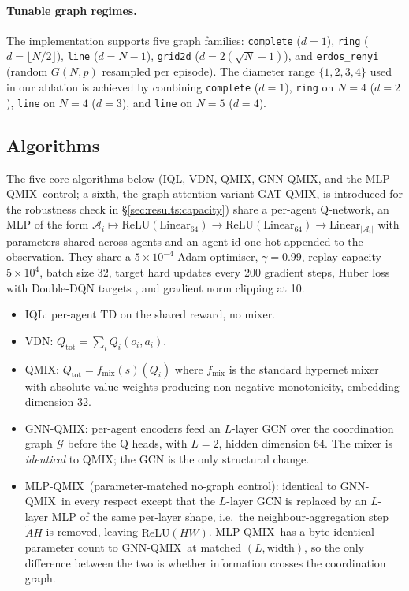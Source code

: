 \documentclass[manuscript, screen, review]{jair}
\providecommand{\citep}{\parencite}
\newcommand{\algoname}[1]{\textsc{#1}}
\newcommand{\iql}{\algoname{IQL}}
\newcommand{\vdn}{\algoname{VDN}}
\newcommand{\qmix}{\algoname{QMIX}}
\newcommand{\gnnqmix}{\algoname{GNN-QMIX}}
\newcommand{\Qtot}{Q_{\mathrm{tot}}}
\newcommand{\Qi}{Q_i}
\newcommand{\Aagent}{\mathcal{A}}
\newcommand{\Gtask}{\mathcal{G}}
\newcommand{\mlpqmix}{\algoname{MLP-QMIX}}
\newcommand{\gatqmix}{\algoname{GAT-QMIX}}
\begin{document}
\paragraph{Tunable graph regimes.} The implementation supports five graph
families: \texttt{complete} ($d=1$), \texttt{ring} ($d=\lfloor N/2 \rfloor$),
\texttt{line} ($d = N-1$), \texttt{grid2d} ($d = 2(\sqrt N - 1)$), and
\texttt{erdos\_renyi} (random $G(N, p)$ resampled per episode). The
diameter range $\{1, 2, 3, 4\}$ used in our ablation is achieved by
combining \texttt{complete} ($d=1$), \texttt{ring} on $N=4$ ($d=2$),
\texttt{line} on $N=4$ ($d=3$), and \texttt{line} on $N=5$ ($d=4$).

\subsection{Algorithms}
\label{sec:algos}

The five core algorithms below (\iql, \vdn, \qmix, \gnnqmix, and the
\mlpqmix\ control; a sixth, the graph-attention variant \gatqmix, is
introduced for the robustness check in \S\ref{sec:results:capacity})
share a per-agent Q-network, an MLP of the form
$\Aagent_i \mapsto \mathrm{ReLU}(\mathrm{Linear}_{64})
\rightarrow \mathrm{ReLU}(\mathrm{Linear}_{64})
\rightarrow \mathrm{Linear}_{|\Aagent_i|}$ with parameters shared across
agents and an agent-id one-hot appended to the observation. They share a
$5\times 10^{-4}$ Adam optimiser, $\gamma = 0.99$, replay capacity $5\times10^4$,
batch size 32, target hard updates every 200 gradient steps, Huber loss
with Double-DQN targets \citep{vanhasselt_2016_doubledqn}, and gradient norm
clipping at 10.

\begin{itemize}[leftmargin=*,itemsep=0pt,topsep=2pt]
  \item \iql: per-agent TD on the shared reward, no mixer.
  \item \vdn: $\Qtot = \sum_i \Qi(o_i, a_i)$.
  \item \qmix: $\Qtot = f_{\text{mix}}(s)(\Qi)$ where $f_{\text{mix}}$ is the
        standard hypernet mixer with absolute-value weights producing
        non-negative monotonicity, embedding dimension 32.
  \item \gnnqmix: per-agent encoders feed an $L$-layer GCN over the
        coordination graph $\Gtask$ before the Q heads, with $L=2$,
        hidden dimension 64. The mixer is \emph{identical} to \qmix; the
        GCN is the only structural change.
  \item \mlpqmix\ (parameter-matched no-graph control): identical to
        \gnnqmix\ in every respect except that the $L$-layer GCN is
        replaced by an $L$-layer MLP of the same per-layer shape, i.e.\ the neighbour-aggregation step $\tilde A H$ is removed,
        leaving $\mathrm{ReLU}(HW)$. \mlpqmix\ has a byte-identical
        parameter count to \gnnqmix\ at matched $(L, \text{width})$, so
        the only difference between the two is whether information
        crosses the coordination graph.
\end{itemize}
\end{document}
